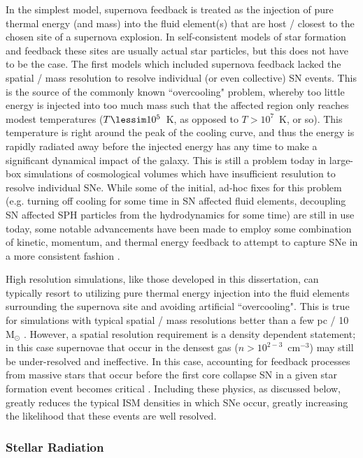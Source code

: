 In the simplest model, supernova feedback is treated as the injection of pure thermal energy (and mass) into the fluid element(s) that are host / closest to the chosen site of a supernova explosion. In self-consistent models of star formation and feedback these sites are usually actual star particles, but this does not have to be the case. The first models which included supernova feedback lacked the spatial / mass resolution to resolve individual (or even collective) SN events. This is the source of the commonly known ``overcooling" problem, whereby too little energy is injected into too much mass such that the affected region only reaches modest temperatures ($T \lessim 10^5$~K, as opposed to $T > 10^7$~K, or so). This temperature is right around the peak of the cooling curve, and thus the energy is rapidly radiated away before the injected energy has any time to make a significant dynamical impact of the galaxy. This is still a problem today in large-box simulations of cosmological volumes which have insufficient resulution to resolve individual SNe. While some of the initial, ad-hoc fixes for this problem (e.g. turning off cooling for some time in SN affected fluid elements, decoupling SN affected SPH particles from the hydrodynamics for some time) are still in use today, some notable advancements have been made to employ some combination of kinetic, momentum, and thermal energy feedback to attempt to capture SNe in a more consistent fashion \citep[e.g.][]{Hopkins2014,Simpson2015,Hopkins2018}.

High resolution simulations, like those developed in this dissertation, can typically resort to utilizing pure thermal energy injection into the fluid elements surrounding the supernova site and avoiding artificial ``overcooling". This is true for simulations with typical spatial / mass resolutions better than a few pc / 10 M$_{\odot}$ \citep{Simpson2015,Hu2018,Smith2018b}. However, a spatial resolution requirement is a density dependent statement; in this case supernovae that occur in the densest gas ($n > 10^{2-3}$~cm$^{-3}$) may still be under-resolved and ineffective. In this case, accounting for feedback processes from massive stars that occur before the first core collapse SN in a given star formation event becomes critical \citep{Hu2016}. Including these physics, as discussed below, greatly reduces the typical ISM densities in which SNe occur, greatly increasing the likelihood that these events are well resolved.

\subsubsection{Stellar Radiation}
\label{intro:sec:radiation}

